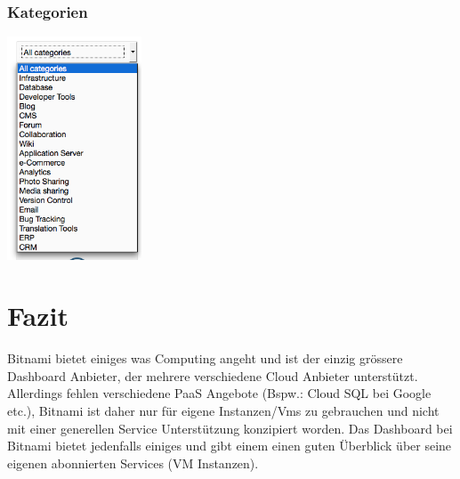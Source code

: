 \documentclass[11pt]{scrartcl}
\begin{document}
\subsubsection{Kategorien}
\includegraphics[width=0.3\textwidth]{categories}

\section{Fazit}
Bitnami bietet einiges was Computing angeht und ist der einzig grössere 
Dashboard Anbieter, der mehrere verschiedene Cloud Anbieter unterstützt.
Allerdings fehlen verschiedene PaaS Angebote (Bspw.: Cloud SQL bei Google etc.), 
Bitnami ist daher nur für eigene Instanzen/Vms zu gebrauchen und nicht mit einer 
generellen Service Unterstützung konzipiert worden.
Das Dashboard bei Bitnami bietet jedenfalls einiges und gibt einem einen guten 
Überblick über seine eigenen abonnierten Services (VM Instanzen).
\end{document}

